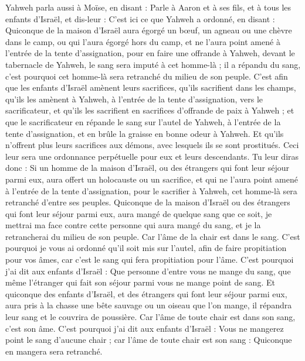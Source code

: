 \begin{multicols}{2}
\VerseOne{}Yahweh parla aussi à Moïse, en disant :
Parle à Aaron et à ses fils, et à tous les enfants d'Israël, et dis-leur : C'est ici ce que Yahweh a ordonné, en disant :
Quiconque de la maison d'Israël aura égorgé un bœuf, un agneau ou une chèvre dans le camp, ou qui l'aura égorgé hors du camp,
et ne l'aura point amené à l'entrée de la tente d'assignation, pour en faire une offrande à Yahweh, devant le tabernacle de Yahweh, le sang sera imputé à cet homme-là ; il a répandu du sang, c'est pourquoi cet homme-là sera retranché du milieu de son peuple.
C'est afin que les enfants d'Israël amènent leurs sacrifices, qu'ils sacrifient dans les champs, qu'ils les amènent à Yahweh, à l'entrée de la tente d'assignation, vers le sacrificateur, et qu'ils les sacrifient en sacrifices d'offrande de paix à Yahweh ;
et que le sacrificateur en répande le sang sur l'autel de Yahweh, à l'entrée de la tente d'assignation, et en brûle la graisse en bonne odeur à Yahweh.
Et qu'ils n'offrent plus leurs sacrifices aux démons, avec lesquels ils se sont prostitués. Ceci leur sera une ordonnance perpétuelle pour eux et leurs descendants.
Tu leur diras donc : Si un homme de la maison d'Israël, ou des étrangers qui font leur séjour parmi eux, aura offert un holocauste ou un sacrifice,
et qui ne l'aura point amené à l'entrée de la tente d'assignation, pour le sacrifier à Yahweh, cet homme-là sera retranché d'entre ses peuples.
Quiconque de la maison d'Israël ou des étrangers qui font leur séjour parmi eux, aura mangé de quelque sang que ce soit, je mettrai ma face contre cette personne qui aura mangé du sang, et je la retrancherai du milieu de son peuple.
Car l'âme de la chair est dans le sang. C'est pourquoi je vous ai ordonné qu'il soit mis sur l'autel, afin de faire propitiation pour vos âmes, car c'est le sang qui fera propitiation pour l'âme.
C'est pourquoi j'ai dit aux enfants d'Israël : Que personne d'entre vous ne mange du sang, que même l'étranger qui fait son séjour parmi vous ne mange point de sang.
Et quiconque des enfants d'Israël, et des étrangers qui font leur séjour parmi eux, aura pris à la chasse une bête sauvage ou un oiseau que l'on mange, il répandra leur sang et le couvrira de poussière.
Car l'âme de toute chair est dans son sang, c'est son âme. C'est pourquoi j'ai dit aux enfants d'Israël : Vous ne mangerez point le sang d'aucune chair ; car l'âme de toute chair est son sang : Quiconque en mangera sera retranché.

\end{multicols}
